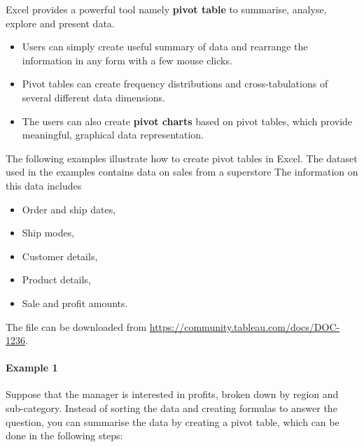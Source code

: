 \documentclass[
]{article}
\theoremstyle{definition}
\theoremstyle{definition}
\theoremstyle{definition}
\theoremstyle{definition}
\theoremstyle{remark}
\begin{document}
Excel provides a powerful tool namely \textbf{pivot table} to summarise,
analyse, explore and present data.

\begin{itemize}
\item
  Users can simply create useful summary of data and rearrange the
  information in any form with a few mouse clicks.
\item
  Pivot tables can create frequency distributions and
  cross-tabulations of several different data dimensions.
\item
  The users can also create \textbf{pivot charts} based on pivot tables,
  which provide meaningful, graphical data representation.
\end{itemize}

The following examples illustrate how to create pivot tables in Excel.
The dataset used in the examples contains data on sales from a
superstore The information on this data includes

\begin{itemize}
\item
  Order and ship dates,
\item
  Ship modes,
\item
  Customer details,
\item
  Product details,
\item
  Sale and profit amounts.
\end{itemize}

The file can be downloaded from
\url{https://community.tableau.com/docs/DOC-1236}.

\hypertarget{example-1}{%
\paragraph*{Example 1}\label{example-1}}

Suppose that the manager is interested in profits, broken down by region
and sub-category. Instead of sorting the data and creating formulas to
answer the question, you can summarise the data by creating a pivot
table, which can be done in the following steps:
\end{document}
